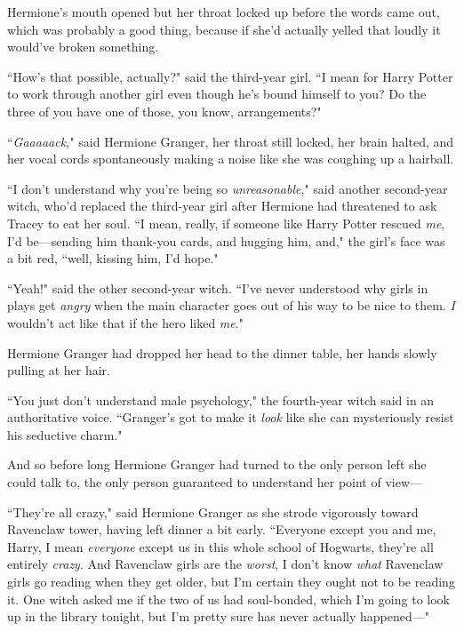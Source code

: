 Hermione's mouth opened but her throat locked up before the words came out, which was probably a good thing, because if she'd actually yelled that loudly it would've broken something.

``How's that possible, actually?" said the third-year girl. ``I mean for Harry Potter to work through another girl even though he's bound himself to you? Do the three of you have one of those, you know, arrangements?"

``\emph{Gaaaaack,}" said Hermione Granger, her throat still locked, her brain halted, and her vocal cords spontaneously making a noise like she was coughing up a hairball.


``I don't understand why you're being so \emph{unreasonable}," said another second-year witch, who'd replaced the third-year girl after Hermione had threatened to ask Tracey to eat her soul. ``I mean, really, if someone like Harry Potter rescued \emph{me}, I'd be—sending him thank-you cards, and hugging him, and," the girl's face was a bit red, ``well, kissing him, I'd hope."

``Yeah!" said the other second-year witch. ``I've never understood why girls in plays get \emph{angry} when the main character goes out of his way to be nice to them. \emph{I} wouldn't act like that if the hero liked \emph{me}."

Hermione Granger had dropped her head to the dinner table, her hands slowly pulling at her hair.

``You just don't understand male psychology," the fourth-year witch said in an authoritative voice. ``Granger's got to make it \emph{look} like she can mysteriously resist his seductive charm."


And so before long Hermione Granger had turned to the only person left she could talk to, the only person guaranteed to understand her point of view—

``They're all crazy," said Hermione Granger as she strode vigorously toward Ravenclaw tower, having left dinner a bit early. ``Everyone except you and me, Harry, I mean \emph{everyone} except us in this whole school of Hogwarts, they're all entirely \emph{crazy}. And Ravenclaw girls are the \emph{worst}, I don't know \emph{what} Ravenclaw girls go reading when they get older, but I'm certain they ought not to be reading it. One witch asked me if the two of us had soul-bonded, which I'm going to look up in the library tonight, but I'm pretty sure has never actually happened—"

